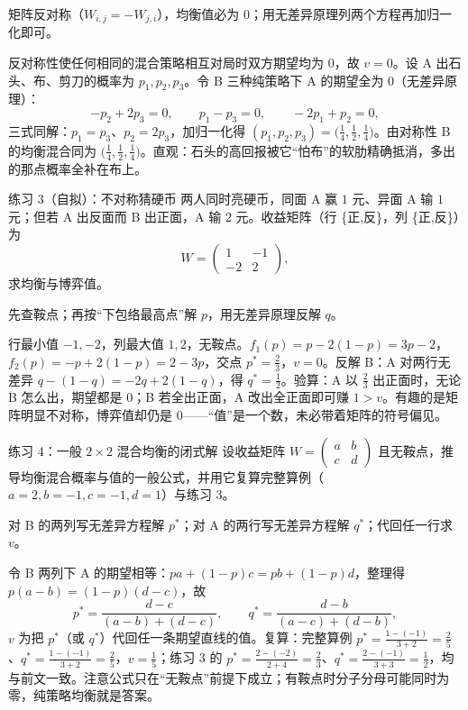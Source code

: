 \hint 矩阵反对称（$W_{i,j}=-W_{j,i}$），均衡值必为 $0$；用无差异原理列两个方程再加归一化即可。

\sol 反对称性使任何相同的混合策略相互对局时双方期望均为 $0$，故 $v=0$。设 A 出石头、布、剪刀的概率为 $p_1,p_2,p_3$。令 B 三种纯策略下 A 的期望全为 $0$（无差异原理）：
\[
 -p_2+2p_3=0,\qquad p_1-p_3=0,\qquad -2p_1+p_2=0,
\]
三式同解：$p_1=p_3$、$p_2=2p_3$，加归一化得 $(p_1,p_2,p_3)=\bigl(\tfrac14,\tfrac12,\tfrac14\bigr)$。由对称性 B 的均衡混合同为 $\bigl(\tfrac14,\tfrac12,\tfrac14\bigr)$。直观：石头的高回报被它“怕布”的软肋精确抵消，多出的那点概率全补在布上。

\begin{problem}{练习 3（自拟）：不对称猜硬币}
两人同时亮硬币，同面 A 赢 $1$ 元、异面 A 输 $1$ 元；但若 A 出反面而 B 出正面，A 输 $2$ 元。收益矩阵（行 \{正,反\}，列 \{正,反\}）为
\[
 W=\begin{pmatrix}1&-1\\-2&2\end{pmatrix},
\]
求均衡与博弈值。
\end{problem}

\hint 先查鞍点；再按“下包络最高点”解 $p$，用无差异原理反解 $q$。

\sol 行最小值 $-1,-2$，列最大值 $1,2$，无鞍点。$f_1(p)=p-2(1-p)=3p-2$，$f_2(p)=-p+2(1-p)=2-3p$，交点 $p^{*}=\tfrac23$，$v=0$。反解 B：A 对两行无差异 $q-(1-q)=-2q+2(1-q)$，得 $q^{*}=\tfrac12$。验算：A 以 $\tfrac23$ 出正面时，无论 B 怎么出，期望都是 $0$；B 若全出正面，A 改出全正面即可赚 $1>v$。有趣的是矩阵明显不对称，博弈值却仍是 $0$——“值”是一个数，未必带着矩阵的符号偏见。

\begin{problem}{练习 4：一般 $2\times2$ 混合均衡的闭式解}
设收益矩阵 $W=\begin{pmatrix}a&b\\ c&d\end{pmatrix}$ 且无鞍点，推导均衡混合概率与值的一般公式，并用它复算完整算例（$a=2,b=-1,c=-1,d=1$）与练习 3。
\end{problem}

\hint 对 B 的两列写无差异方程解 $p^{*}$；对 A 的两行写无差异方程解 $q^{*}$；代回任一行求 $v$。

\sol 令 B 两列下 A 的期望相等：$pa+(1-p)c=pb+(1-p)d$，整理得 $p(a-b)=(1-p)(d-c)$，故
\[
 p^{*}=\frac{d-c}{(a-b)+(d-c)},\qquad
 q^{*}=\frac{d-b}{(a-c)+(d-b)},
\]
$v$ 为把 $p^{*}$（或 $q^{*}$）代回任一条期望直线的值。复算：完整算例 $p^{*}=\tfrac{1-(-1)}{3+2}=\tfrac25$、$q^{*}=\tfrac{1-(-1)}{3+2}=\tfrac25$，$v=\tfrac15$；练习 3 的 $p^{*}=\tfrac{2-(-2)}{2+4}=\tfrac23$、$q^{*}=\tfrac{2-(-1)}{3+3}=\tfrac12$，均与前文一致。注意公式只在“无鞍点”前提下成立；有鞍点时分子分母可能同时为零，纯策略均衡就是答案。

